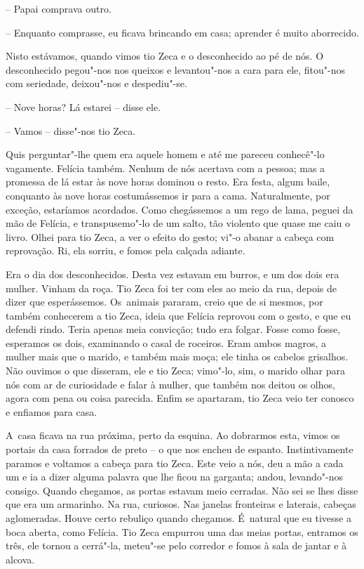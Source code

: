 -- Papai comprava outro.

-- Enquanto comprasse, eu ficava brincando em casa; aprender é muito
aborrecido.

Nisto estávamos, quando vimos tio Zeca e o desconhecido ao pé de nós. O
desconhecido pegou"-nos nos queixos e levantou"-nos a cara para ele,
fitou"-nos com seriedade, deixou"-nos e despediu"-se.

-- Nove horas? Lá estarei -- disse ele.

-- Vamos -- disse"-nos tio Zeca.

Quis perguntar"-lhe quem era aquele homem e até me pareceu conhecê"-lo
vagamente. Felícia também. Nenhum de nós acertava com a pessoa; mas a
promessa de lá estar às nove horas dominou o resto. Era festa, algum
baile, conquanto às nove horas costumássemos ir para a cama.
Naturalmente, por exceção, estaríamos acordados. Como chegássemos a um
rego de lama, peguei da mão de Felícia, e transpusemo"-lo de um salto,
tão violento que quase me caiu o livro. Olhei para tio Zeca, a ver o
efeito do gesto; vi"-o abanar a cabeça com reprovação. Ri, ela sorriu, e
fomos pela calçada adiante.

Era o dia dos desconhecidos. Desta vez estavam em burros, e um dos dois
era mulher. Vinham da roça. Tio Zeca foi ter com eles ao meio da rua,
depois de dizer que esperássemos. Os~animais pararam, creio que de si
mesmos, por também conhecerem a tio Zeca, ideia que Felícia reprovou com
o gesto, e que eu defendi rindo. Teria apenas meia convicção; tudo era
folgar. Fosse como fosse, esperamos os dois, examinando o casal de
roceiros. Eram ambos magros, a mulher mais que o marido, e também mais
moça; ele tinha os cabelos grisalhos. Não ouvimos o que disseram, ele e
tio Zeca; vimo"-lo, sim, o marido olhar para nós com ar de curiosidade e
falar à mulher, que também nos deitou os olhos, agora com pena ou coisa
parecida. Enfim se apartaram, tio Zeca veio ter conosco e enfiamos para
casa.

A~casa ficava na rua próxima, perto da esquina. Ao dobrarmos esta, vimos
os portais da casa forrados de preto -- o que nos encheu de espanto.
Instintivamente paramos e voltamos a cabeça para tio Zeca. Este veio a
nós, deu a mão a cada um e ia a dizer alguma palavra que lhe ficou na
garganta; andou, levando"-nos consigo. Quando chegamos, as portas estavam
meio cerradas. Não sei se lhes disse que era um armarinho. Na rua,
curiosos. Nas janelas fronteiras e laterais, cabeças aglomeradas. Houve
certo rebuliço quando chegamos. É~natural que eu tivesse a boca aberta,
como Felícia. Tio Zeca empurrou uma das meias portas, entramos os três,
ele tornou a cerrá"-la, meteu"-se pelo corredor e fomos à sala de jantar e
à alcova.

